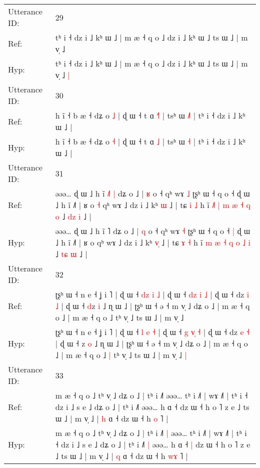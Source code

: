 \documentclass[10pt]{article}
\DeclareRobustCommand{\hl}[1]{{\textcolor{red}{#1}}}
\begin{document}
\begin{longtable}{ll}
 \\
\midrule
Utterance ID: & 29 \\
Ref: & tʰ i ˧ dz i ˩ kʰ ɯ ˩ | m æ ˧ q o ˩ dz i ˩ kʰ ɯ ˩ ts ɯ ˩ | m v̩ ˩\hl{}\hl{}
 \\
Hyp: & tʰ i ˧ dz i ˩ kʰ ɯ ˩ | m æ ˧ q o ˩ dz i ˩ kʰ ɯ ˩ ts ɯ ˩ | m v̩ ˩\hl{ }\hl{|}
 \\
\midrule
Utterance ID: & 30 \\
Ref: & h ĩ ˧ b æ ˧ dʑ o \hl{˩} | ɖ ɯ ˧ t ɑ \hl{˧}\hl{˥} | tsʰ ɯ \hl{˩}\hl{˥} | tʰ i ˧ dz i ˩ kʰ ɯ ˩ |
 \\
Hyp: & h ĩ ˧ b æ ˧ dʑ o \hl{˧} | ɖ ɯ ˧ t ɑ \hl{}\hl{˩} | tsʰ ɯ \hl{}\hl{˧} | tʰ i ˧ dz i ˩ kʰ ɯ ˩ |
 \\
\midrule
Utterance ID: & 31 \\
Ref: & əəə… ɖ ɯ ˩ h ĩ \hl{˩}˥\hl{ }\hl{|} dʑ o ˩ | \hl{ʁ} o ˧ qʰ wɤ \hl{˩} ʈʂʰ ɯ ˧ q o ˧\hl{}\hl{} ɖ ɯ ˩ h ĩ ˩˥ | ʁ o\hl{ }\hl{˧} qʰ wɤ ˩ dz i ˩ kʰ \hl{}\hl{ɯ} ˩ | tɕ \hl{i} \hl{˩} h ĩ \hl{˩}\hl{˥} \hl{|} \hl{m} \hl{æ} \hl{˧} \hl{q} \hl{o} ˩ \hl{d}\hl{z} \hl{i} ˩ |
 \\
Hyp: & əəə… ɖ ɯ ˩ h ĩ \hl{}˥\hl{}\hl{} dʑ o ˩ | \hl{q} o ˧ qʰ wɤ \hl{˧} ʈʂʰ ɯ ˧ q o ˧\hl{ }\hl{|} ɖ ɯ ˩ h ĩ ˩˥ | ʁ o\hl{}\hl{} qʰ wɤ ˩ dz i ˩ kʰ \hl{v}\hl{̩} ˩ | tɕ \hl{ɤ} \hl{˧} h ĩ \hl{}\hl{m} \hl{æ} \hl{˧} \hl{q} \hl{o} \hl{˩} \hl{i} ˩ \hl{t}\hl{ɕ} \hl{ɯ} ˩ |
 \\
\midrule
Utterance ID: & 32 \\
Ref: & ʈʂʰ ɯ ˧ n e ˧ ʝ i ˥ | ɖ ɯ ˧ \hl{d}\hl{z} \hl{i} \hl{˩} | ɖ ɯ ˧ \hl{d}\hl{z}\hl{ }\hl{i} \hl{˩} | ɖ ɯ ˧ dz \hl{i} \hl{˩} | ɖ ɯ ˧ \hl{d}z \hl{i} ˩ ɳ ɯ ˩ | ʈʂʰ ɯ ˧ ə ˧ m v̩ ˩ dʑ o ˩ | m æ ˧ q o ˩ | m æ ˧ q o ˩\hl{}\hl{} tʰ v̩ ˩ ts ɯ ˩ | m v̩ ˩\hl{}\hl{}
 \\
Hyp: & ʈʂʰ ɯ ˧ n e ˧ ʝ i ˥ | ɖ ɯ ˧ \hl{}\hl{l} \hl{e} \hl{˧} | ɖ ɯ ˧ \hl{g}\hl{ }\hl{v}\hl{̩} \hl{˧} | ɖ ɯ ˧ dz \hl{e} \hl{˧} | ɖ ɯ ˧ \hl{}z \hl{o} ˩ ɳ ɯ ˩ | ʈʂʰ ɯ ˧ ə ˧ m v̩ ˩ dʑ o ˩ | m æ ˧ q o ˩ | m æ ˧ q o ˩\hl{ }\hl{|} tʰ v̩ ˩ ts ɯ ˩ | m v̩ ˩\hl{ }\hl{|}
 \\
\midrule
Utterance ID: & 33 \\
Ref: & m æ ˧ q o ˩ tʰ v̩ ˩ dʑ o ˩ | tʰ i ˩˥\hl{}\hl{} əəə… tʰ i ˩˥ | wɤ ˩˥ | tʰ i ˧ dz i ˩ s e ˩ dʑ o ˩ | tʰ i ˩˥\hl{}\hl{} əəə… h ɑ ˧\hl{}\hl{} dz ɯ ˧ h o ˥ z e ˩ ts ɯ ˩ | m v̩ ˩ | \hl{h} ɑ ˧ dz ɯ ˧ h \hl{}\hl{o} ˥ |
 \\
Hyp: & m æ ˧ q o ˩ tʰ v̩ ˩ dʑ o ˩ | tʰ i ˩˥\hl{ }\hl{|} əəə… tʰ i ˩˥ | wɤ ˩˥ | tʰ i ˧ dz i ˩ s e ˩ dʑ o ˩ | tʰ i ˩˥\hl{ }\hl{|} əəə… h ɑ ˧\hl{ }\hl{|} dz ɯ ˧ h o ˥ z e ˩ ts ɯ ˩ | m v̩ ˩ | \hl{q} ɑ ˧ dz ɯ ˧ h \hl{w}\hl{ɤ} ˥ |

\end{longtable}
\end{document}
